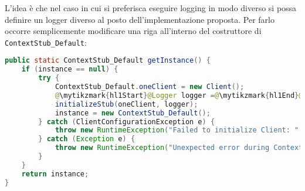 L'idea è che nel caso in cui si preferisca eseguire logging in modo diverso si possa definire un logger diverso al posto dell'implementazione proposta. Per farlo occorre semplicemente modificare una riga all'interno del costruttore di \texttt{ContextStub\_Default}:
\begin{lstlisting}[language=Java, caption=Costruttore ContextStub\_Default, label=code:CostContextStub]
public static ContextStub_Default getInstance() {
    if (instance == null) {
        try {
            ContextStub_Default.oneClient = new Client();
            @\mytikzmark{hl1Start}@Logger logger =@\mytikzmark{hl1End}@ @\mytikzmark{hl2Start}@FileLoggerFactory.make("logs/virtualMachines.log");@\mytikzmark{hl2End}@
            initializeStub(oneClient, logger);
            instance = new ContextStub_Default();
        } catch (ClientConfigurationException e) {
            throw new RuntimeException("Failed to initialize Client: " + e.getMessage(), e);
        } catch (Exception e) {
            throw new RuntimeException("Unexpected error during ContextStub_Default initialization: " + e.getMessage(), e);
        }
    }
    return instance;
}
\end{lstlisting}

